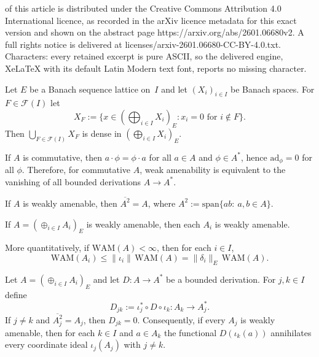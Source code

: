 \documentclass[10pt,a4paper]{amsart}
\newcommand{\WAM}{\mathrm{WAM}}  %
\newcommand{\ad}{\mathrm{ad}}
\newcommand{\cF}{\mathcal{F}}
\renewcommand{\le}{\leqslant}
\begin{document}
of this article is distributed under the Creative Commons Attribution 4.0 International licence, as recorded in the arXiv licence metadata for this exact version and shown on the abstract page https://arxiv.org/abs/2601.06680v2. A full rights notice is delivered at licenses/arxiv-2601.06680-CC-BY-4.0.txt. Characters: every retained excerpt is pure ASCII, so the delivered engine, XeLaTeX with its default Latin Modern text font, reports no missing character.
\begin{lemma}\label{lem:dense-finite-support}
Let $E$ be a Banach sequence lattice on~$I$ and let $(X_i)_{i\in I}$ be Banach spaces.
For $F\in\cF(I)$ let
\[
X_F:=\{x\in (\bigoplus_{i\in I}X_i)_E : x_i=0 \text{ for } i\notin F\}.
\]
Then $\bigcup_{F\in\cF(I)}X_F$ is dense in $(\bigoplus_{i\in I}X_i)_E$.
\end{lemma}

\begin{remark}\label{rem:WA-commutative}
If $A$ is commutative, then $a\cdot\phi=\phi\cdot a$ for all $a\in A$ and $\phi\in A^*$, hence $\ad_\phi=0$ for all $\phi$.
Therefore, for commutative $A$, weak amenability is equivalent to the vanishing of all bounded derivations $A\to A^*$.
\end{remark}

\begin{lemma}\label{lem:WA-essential}
If $A$ is weakly amenable, then $\overline{A^2}=A$, where $A^2:=\mathrm{span}\{ab:\ a,b\in A\}$.
\end{lemma}

\begin{proposition}\label{prop:WA-to-summands}
If $A=(\oplus_{i\in I}A_i)_E$ is weakly amenable, then each $A_i$ is weakly amenable.

More quantitatively, if $\WAM(A)<\infty$, then for each $i\in I$,
\[
\WAM(A_i)\le \|\iota_i\|\,\WAM(A)=\|\delta_i\|_E\,\WAM(A).
\]
\end{proposition}

\begin{lemma}\label{lem:off-diagonal}
Let $A=(\oplus_{i\in I}A_i)_E$ and let $D\colon A\to A^*$ be a bounded derivation.
For $j,k\in I$ define
\[
D_{jk}:=\iota_j^*\circ D\circ\iota_k\colon A_k\longrightarrow A_j^*.
\]
If $j\neq k$ and $\overline{A_j^2}=A_j$, then $D_{jk}=0$.  Consequently, if every $A_j$ is
weakly amenable, then for each $k\in I$ and $a\in A_k$ the functional
$D(\iota_k(a))$ annihilates every coordinate ideal $\iota_j(A_j)$ with $j\neq k$.
\end{lemma}
\end{document}
